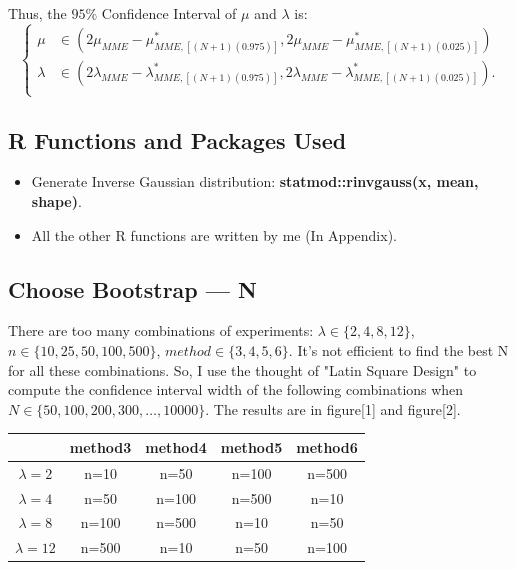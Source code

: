 \documentclass[12pt]{article}
\begin{document}
Thus, the $95\%$ Confidence Interval of $\mu$ and $\lambda$ is: 
 \begin{equation*}
\left\{                         
\begin{aligned}
\mu &\in (2\mu_{MME}-\mu_{MME,[(N+1)(0.975)]}^{*},2\mu_{MME}-\mu_{MME,[(N+1)(0.025)]}^{*})\\
\lambda &\in (2\lambda_{MME}-\lambda_{MME,[(N+1)(0.975)]}^{*},2\lambda_{MME}-\lambda_{MME,[(N+1)(0.025)]}^{*}).\\
\end{aligned}
\right.
\end{equation*}



\subsection{R Functions and Packages Used}


\begin{itemize}
  \item Generate Inverse Gaussian distribution: \textbf{statmod::rinvgauss(x, mean, shape)}.
    \item All the other R functions are written by me (In Appendix).
\end{itemize}



\subsection{Choose Bootstrap --- N}
There are too many combinations of experiments: $\lambda \in \{2,4,8,12\}$, $n \in \{10,25,50,100,500\}$, $method \in \{3,4,5,6\}$. It's not efficient to find the best N for all these combinations. So, I use the thought of "Latin Square Design" to compute the confidence interval width of the following combinations when $N \in \{50,100,200,300,\dots,10000\}$. The results are in figure[1] and figure[2].\\

\begin{tabular}{|c|cccc|}
\hline
  & method3 & method4 & method5 & method6\\
 \hline
$\lambda=2$ & n=10 & n=50 & n=100 & n=500 \\
$\lambda=4$ & n=50 & n=100 & n=500 & n=10 \\
$\lambda=8$ & n=100 & n=500 & n=10 & n=50 \\
$\lambda=12$ & n=500 & n=10 & n=50 & n=100\\
\hline
\end{tabular}
\\
\end{document}
